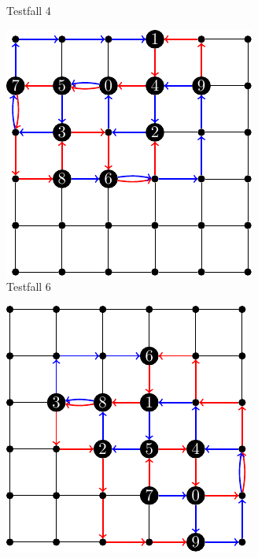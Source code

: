 \documentclass[bachelor, german]{algothesis}
\begin{document}
\begin{figure}[H]
\begin{subfigure}[b]{0.4\textwidth}
        \caption{Testfall 4}
        \label{fig:teilbild_b}
    \end{subfigure}
    \begin{subfigure}[b]{0.4\textwidth}
        \centering
        \includegraphics[width=\textwidth]{figures/Testfall6.pdf}
        \caption{Testfall 6}
        \label{fig:teilbild_c}
    \end{subfigure}
    \hfill
    \begin{subfigure}[b]{0.4\textwidth}
        \centering
        \includegraphics[width=\textwidth]{figures/Testfall7.pdf}

\end{subfigure}
\end{figure}
\end{document}
